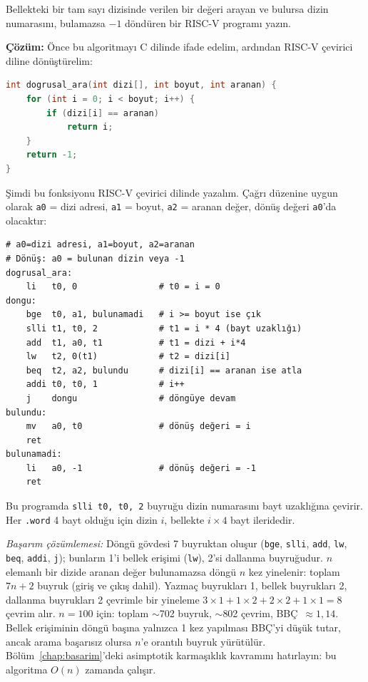 \begin{ornek}[4.7]
\label{orn:dogrusal-arama}
Bellekteki bir tam sayı dizisinde verilen bir değeri arayan ve bulursa dizin numarasını, bulamazsa $-1$ döndüren bir RISC-V programı yazın.

\textbf{Çözüm:} Önce bu algoritmayı C dilinde ifade edelim, ardından RISC-V çevirici diline dönüştürelim:

\begin{lstlisting}[language=C, style=alistirma-kod]
int dogrusal_ara(int dizi[], int boyut, int aranan) {
    for (int i = 0; i < boyut; i++) {
        if (dizi[i] == aranan)
            return i;
    }
    return -1;
}
\end{lstlisting}

Şimdi bu fonksiyonu RISC-V çevirici dilinde yazalım. Çağrı düzenine uygun olarak \texttt{a0} = dizi adresi, \texttt{a1} = boyut, \texttt{a2} = aranan değer, dönüş değeri \texttt{a0}'da olacaktır:

\begin{lstlisting}[style=riscv]
# a0=dizi adresi, a1=boyut, a2=aranan
# Dönüş: a0 = bulunan dizin veya -1
dogrusal_ara:
    li   t0, 0                # t0 = i = 0
dongu:
    bge  t0, a1, bulunamadi   # i >= boyut ise çık
    slli t1, t0, 2            # t1 = i * 4 (bayt uzaklığı)
    add  t1, a0, t1           # t1 = dizi + i*4
    lw   t2, 0(t1)            # t2 = dizi[i]
    beq  t2, a2, bulundu      # dizi[i] == aranan ise atla
    addi t0, t0, 1            # i++
    j    dongu                # döngüye devam
bulundu:
    mv   a0, t0               # dönüş değeri = i
    ret
bulunamadi:
    li   a0, -1               # dönüş değeri = -1
    ret
\end{lstlisting}

Bu programda \texttt{slli t0, t0, 2} buyruğu dizin numarasını bayt uzaklığına çevirir. Her \texttt{.word} 4 bayt olduğu için dizin $i$, bellekte $i \times 4$ bayt ileridedir.

\emph{Başarım çözümlemesi:} Döngü gövdesi 7 buyruktan oluşur (\texttt{bge}, \texttt{slli}, \texttt{add}, \texttt{lw}, \texttt{beq}, \texttt{addi}, \texttt{j}); bunların 1'i bellek erişimi (\texttt{lw}), 2'si dallanma buyruğudur. $n$ elemanlı bir dizide aranan değer bulunamazsa döngü $n$ kez yinelenir: toplam $7n + 2$ buyruk (giriş ve çıkış dahil). Yazmaç buyrukları 1, bellek buyrukları 2, dallanma buyrukları 2 çevrimle bir yineleme $3 \times 1 + 1 \times 2 + 2 \times 2 + 1 \times 1 = 8$ çevrim alır. $n = 100$ için: toplam $\sim$702 buyruk, $\sim$802 çevrim, BBÇ~$\approx 1{,}14$. Bellek erişiminin döngü başına yalnızca 1 kez yapılması BBÇ'yi düşük tutar, ancak arama başarısız olursa $n$'e orantılı buyruk yürütülür. Bölüm~\ref{chap:basarim}'deki asimptotik karmaşıklık kavramını hatırlayın: bu algoritma $O(n)$ zamanda çalışır.
\end{ornek}


